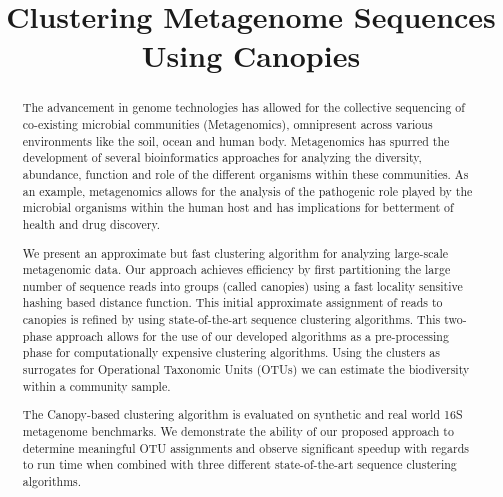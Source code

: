 \documentclass[10pt, conference, compsocconf]{IEEEtran}
\begin{document}
\title{Clustering Metagenome Sequences Using Canopies}

\author{
}
\maketitle

\begin{abstract}
	
The advancement in genome technologies has allowed for the 
collective sequencing of co-existing microbial communities (Metagenomics), omnipresent 
across various environments like the soil, ocean and human body.
%
Metagenomics has 
spurred the development of several 
bioinformatics approaches for analyzing 
the diversity, abundance, function and role of the 
different organisms 
within these communities. 
%
As an example,  metagenomics allows for the analysis 
of the pathogenic role played by the microbial organisms within the 
human host and has implications for betterment of health and drug discovery. 


We present 
an approximate  but fast 
clustering algorithm
for analyzing 
large-scale metagenomic data. Our approach 
achieves efficiency 
by first partitioning the large number of sequence reads into 
groups (called canopies) using a fast locality sensitive hashing based 
distance function. This 
initial approximate assignment of reads to 
canopies is refined by using 
state-of-the-art
sequence clustering algorithms. This
two-phase 
approach allows for the
use  of 
our developed algorithms as a pre-processing phase for computationally expensive 
clustering 
algorithms. Using the clusters as surrogates for 
Operational Taxonomic Units (OTUs) we 
can estimate  the biodiversity within 
a community sample.

The Canopy-based clustering algorithm is evaluated on synthetic and real 
world 16S 
metagenome  benchmarks. We demonstrate the ability 
of our proposed approach to  
determine meaningful OTU assignments and observe
significant speedup with regards 
to run time when combined with three 
different state-of-the-art sequence clustering algorithms. 


\end{abstract}
\end{document}
